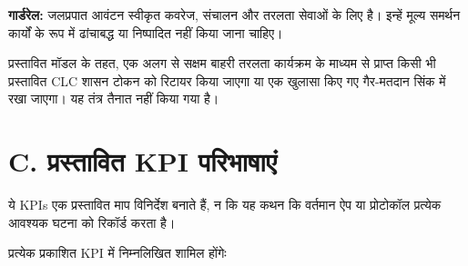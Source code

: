 \documentclass[11pt]{article}
\begin{document}
\textbf{गार्डरेल:} जलप्रपात आवंटन स्वीकृत कवरेज, संचालन और तरलता सेवाओं के लिए है। इन्हें मूल्य समर्थन कार्यों के रूप में ढांचाबद्ध या निष्पादित नहीं किया जाना चाहिए।

प्रस्तावित मॉडल के तहत, एक अलग से सक्षम बाहरी तरलता कार्यक्रम के माध्यम से प्राप्त किसी भी प्रस्तावित CLC शासन टोकन को रिटायर किया जाएगा या एक खुलासा किए गए गैर-मतदान सिंक में रखा जाएगा। यह तंत्र तैनात नहीं किया गया है।


\section*{C. प्रस्तावित KPI परिभाषाएं}

ये KPIs एक प्रस्तावित माप विनिर्देश बनाते हैं, न कि यह कथन कि वर्तमान ऐप या प्रोटोकॉल प्रत्येक आवश्यक घटना को रिकॉर्ड करता है।

प्रत्येक प्रकाशित KPI में निम्नलिखित शामिल होंगेः
\end{document}
